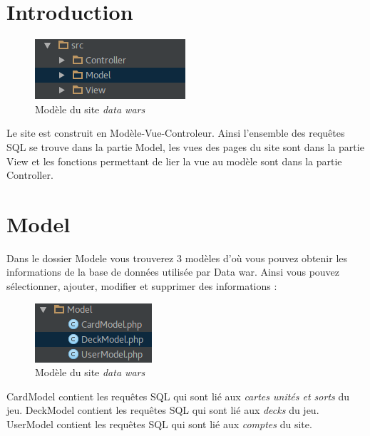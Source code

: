 \documentclass[a4paper,11pt]{report}
\begin{document}
\section{Introduction}

	\begin{figure}[th]
		\begin{center}
		\includegraphics[scale=0.4]{Assets/mvc.png}
      		\caption{Modèle du site \textit{data wars}}
      		\label{fig1}
     		\end{center}
	\end{figure}

	Le site est construit en Modèle-Vue-Controleur. Ainsi l'ensemble des requêtes SQL se trouve dans la partie Model, les vues des pages du site sont dans la partie View et les fonctions permettant de lier la vue au modèle sont dans la partie Controller.

\section{Model}
	Dans le dossier Modele vous trouverez 3 modèles d'où vous pouvez obtenir les informations de la base de données utilisée par Data war. Ainsi vous pouvez sélectionner, ajouter, modifier et supprimer des informations :

	\begin{figure}[th]
		\begin{center}
		\includegraphics[scale=0.4]{Assets/modele.png}
      		\caption{Modèle du site \textit{data wars}}
      		\label{fig2}
     		\end{center}
	\end{figure}
    
	CardModel contient les requêtes SQL qui sont lié aux \textit{cartes unités et sorts} du jeu.
	DeckModel contient les requêtes SQL qui sont lié aux \textit{decks} du jeu.
	UserModel contient les requêtes SQL qui sont lié aux \textit{comptes} du site.    
\end{document}
